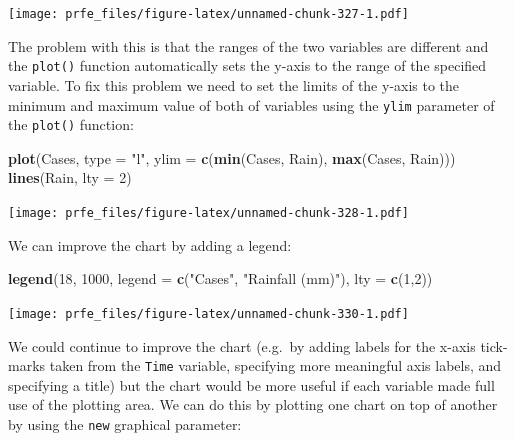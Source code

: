 \documentclass[12pt,a4paper]{book}
\newenvironment{Shaded}{\begin{snugshade}}{\end{snugshade}}
\newcommand{\KeywordTok}[1]{\textcolor[rgb]{0.13,0.29,0.53}{\textbf{#1}}}
\newcommand{\DataTypeTok}[1]{\textcolor[rgb]{0.13,0.29,0.53}{#1}}
\newcommand{\DecValTok}[1]{\textcolor[rgb]{0.00,0.00,0.81}{#1}}
\newcommand{\StringTok}[1]{\textcolor[rgb]{0.31,0.60,0.02}{#1}}
\newcommand{\NormalTok}[1]{#1}
\theoremstyle{definition}
\theoremstyle{definition}
\theoremstyle{definition}
\theoremstyle{remark}
\begin{document}
\texttt{[image: prfe\_files/figure-latex/unnamed-chunk-327-1.pdf]}

The problem with this is that the ranges of the two variables are
different and the \texttt{plot()} function automatically sets the y-axis
to the range of the specified variable. To fix this problem we need to
set the limits of the y-axis to the minimum and maximum value of both of
variables using the \texttt{ylim} parameter of the \texttt{plot()}
function:

\begin{Shaded}
\begin{Highlighting}[]
\KeywordTok{plot}\NormalTok{(Cases, }\DataTypeTok{type =} \StringTok{"l"}\NormalTok{, }\DataTypeTok{ylim =} \KeywordTok{c}\NormalTok{(}\KeywordTok{min}\NormalTok{(Cases, Rain), }\KeywordTok{max}\NormalTok{(Cases, Rain)))}
\KeywordTok{lines}\NormalTok{(Rain, }\DataTypeTok{lty =} \DecValTok{2}\NormalTok{)}
\end{Highlighting}
\end{Shaded}

\texttt{[image: prfe\_files/figure-latex/unnamed-chunk-328-1.pdf]}

We can improve the chart by adding a legend:

\begin{Shaded}
\begin{Highlighting}[]
\KeywordTok{legend}\NormalTok{(}\DecValTok{18}\NormalTok{, }\DecValTok{1000}\NormalTok{, }\DataTypeTok{legend =} \KeywordTok{c}\NormalTok{(}\StringTok{"Cases"}\NormalTok{, }\StringTok{"Rainfall (mm)"}\NormalTok{), }\DataTypeTok{lty =} \KeywordTok{c}\NormalTok{(}\DecValTok{1}\NormalTok{,}\DecValTok{2}\NormalTok{))}
\end{Highlighting}
\end{Shaded}

\texttt{[image: prfe\_files/figure-latex/unnamed-chunk-330-1.pdf]}

We could continue to improve the chart (e.g.~by adding labels for the
x-axis tick-marks taken from the \texttt{Time} variable, specifying more
meaningful axis labels, and specifying a title) but the chart would be
more useful if each variable made full use of the plotting area. We can
do this by plotting one chart on top of another by using the
\texttt{new} graphical parameter:
\end{document}

